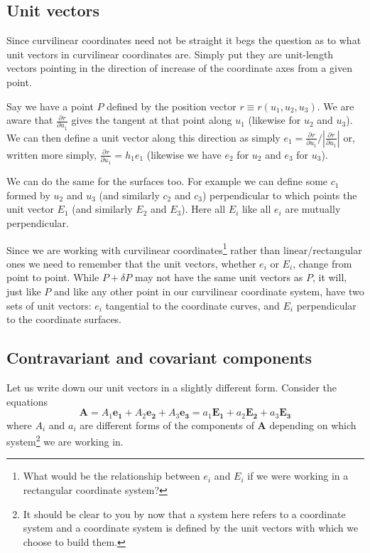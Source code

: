 \documentclass{tufte-handout}
\providecommand*{\pdif}[3][]{\frac{\partial^{#1}#2}{\partial #3^{#1}}}
\begin{document}
\subsection{Unit vectors}

Since curvilinear coordinates need not be straight it begs the question as to what unit vectors in curvilinear coordinates are. Simply put they are unit-length vectors pointing in the direction of increase of the coordinate axes from a given point.

Say we have a point $P$ defined by the position vector $r \equiv r(u_1,u_2,u_3)$. We are aware that $\pdif{r}{u_1}$ gives the tangent at that point along $u_1$ (likewise for $u_2$ and $u_3$). We can then define a unit vector along this direction as simply $e_1 = \pdif{r}{u_1}\big/\left|\pdif{r}{u_1}\right|$ or, written more simply, $\pdif{r}{u_1} = h_1 e_1$ (likewise we have $e_2$ for $u_2$ and $e_3$ for $u_3$).

We can do the same for the surfaces too. For example we can define some $c_1$ formed by $u_2$ and $u_3$ (and similarly $c_2$ and $c_3$) perpendicular to which points the unit vector $E_1$ (and similarly $E_2$ and $E_3$). Here all $E_i$ like all $e_i$ are mutually perpendicular.

Since we are working with curvilinear coordinates\footnote{What would be the relationship between $e_i$ and $E_i$ if we were working in a rectangular coordinate system?} rather than linear/rectangular ones we need to remember that the unit vectors, whether $e_i$ or $E_i$, change from point to point. While $P + \delta P$ may not have the same unit vectors as $P$, it will, just like $P$ and like any other point in our curvilinear coordinate system, have two sets of unit vectors: $e_i$ tangential to the coordinate curves, and $E_i$ perpendicular to the coordinate surfaces.

\subsection{Contravariant and covariant components}

Let us write down our unit vectors in a slightly different form. Consider the equations \[ \mathbf{A} = A_1 \mathbf{e_1} + A_2 \mathbf{e_2} + A_3 \mathbf{e_3} = a_1 \mathbf{E_1} + a_2 \mathbf{E_2} + a_3 \mathbf{E_3} \] where $A_i$ and $a_i$ are different forms of the components of $\mathbf{A}$ depending on which system\footnote{It should be clear to you by now that a system here refers to a coordinate system and a coordinate system is defined by the unit vectors with which we choose to build them.} we are working in.
\end{document}
